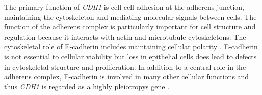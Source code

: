 The primary function of \textit{CDH1} is cell-cell adhesion at the adherens junction, maintaining the cytoskeleton and mediating molecular signals between cells. The function of the adherens complex is particularly important for cell structure and regulation because it interacts with actin and microtubule cytoskeletons. The cytoskeletal role of \gls{E-cadherin} %
includes maintaining cellular polarity \citep{Jeanes2008}. \gls{E-cadherin} is not \gls{essential} to cellular viability but loss in epithelial cells does lead to defects in cytoskeletal structure and proliferation. In addition to a central role in the adherens complex, \gls{E-cadherin} is involved in many other cellular functions and thus \textit{CDH1} is regarded as a highly \glspl{pleiotropy} gene \citep{Kroepil2012}.

